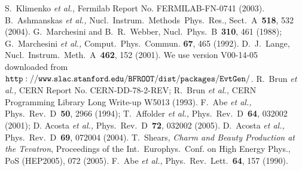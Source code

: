 \begin{thebibliography}{99}
  S.~Klimenko {\it et al.,} Fermilab Report No.
                  FERMILAB-FN-0741 (2003).
     B.~Ashmanskas {\it et al.,} 
                  Nucl.~Instrum.~Methods~Phys.~Res., Sect.~A~{\bf 518}, 532 
                  (2004).
  G.~Marchesini and B.~R.~Webber, Nucl.~Phys.~B~{\bf 310}, 
                  461 (1988); G.~Marchesini {\it et al.,} 
                  Comput.~Phys.~Commun. {\bf 67}, 465 (1992).
  D.~J.~Lange, Nucl.~Instrum.~Meth.~A~{\bf 462}, 152 (2001).
                  We use version {\sc V00-14-05}\\ downloaded from
               $\tt http://www.slac.stanford.edu/BFROOT/dist/packages/EvtGen/$.
   R.~Brun  {\it et al.,} CERN Report No. CERN-DD-78-2-REV;
                  R.~Brun  {\it et al.,} CERN Programming Library Long 
                  Write-up W5013 (1993).
   F.~Abe  {\it et al.,}  Phys.~Rev.~D~{\bf 50}, 2966 (1994);
                  T.~Affolder  {\it et al.,} Phys.~Rev.~D~{\bf 64}, 032002
                 (2001); 
                  D. Acosta  {\it et al.,} Phys.~Rev.~D~{\bf 72}, 032002 (2005).
   D.~Acosta {\it et al.,} Phys.~Rev.~D~{\bf 69}, 072004 (2004).
  T.~Shears, {\it Charm and Beauty Production at the Tevatron},
                  Proceedings of the Int.~Europhys.~Conf. on High Energy
                  Phys., PoS (HEP2005), 072 (2005).
   F.~Abe  {\it et al.,} Phys.~Rev.~Lett.~{\bf 64}, 157 (1990).
\end{thebibliography}








